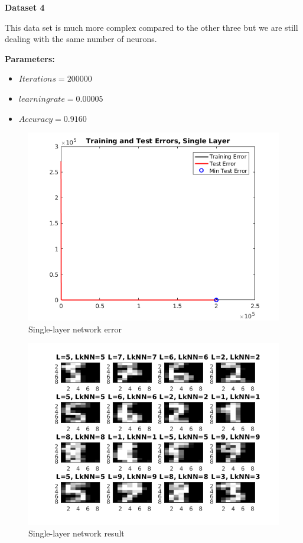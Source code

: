 \documentclass[a4paper,12pt]{article}
\begin{document}
\noindent \textbf{Dataset 4}

This data set is much more complex compared to the other three but we are still dealing with the same number of neurons.

\textbf{Parameters:}
\begin{itemize}
\item $Iterations = 200000$
\item $learning rate = 0.00005$
\item $Accuracy = 0.9160$
\end{itemize}

\begin{figure}[H]
\centering
  \begin{minipage}[]{1\textwidth}
  \caption{Single-layer network error}\label{fig:single_4_error}
  \includegraphics[width=\textwidth]{figures/single_4_error.png}
  \end{minipage}
\end{figure}

\begin{figure}[H]
\centering
  \begin{minipage}[]{1\textwidth}
  \caption{Single-layer network result}\label{fig:single_4_test}
  \includegraphics[width=\textwidth]{figures/single_4_test.png}
  \end{minipage}
\end{figure}
\end{document}

